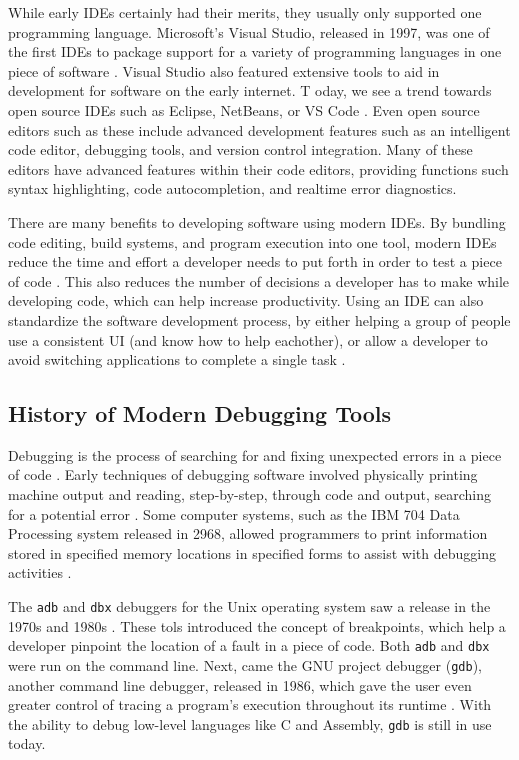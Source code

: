 \documentclass{article}
\begin{document}
While early IDEs certainly had their merits, they usually only supported one programming language. Microsoft's Visual Studio, released in 1997, was one of the first IDEs to package support for a variety of programming languages in one piece of software \cite{Microsoft_1997}. Visual Studio also featured extensive tools to aid in development for software on the early internet. 
T
oday, we see a trend towards open source IDEs such as Eclipse, NetBeans, or VS Code \cite{Apache_2023, EclipseFoundation_2023, Microsoft_2023a}. Even open source editors such as these include advanced development features such as an intelligent code editor, debugging tools, and version control integration. Many of these editors have advanced features within their code editors, providing functions such syntax highlighting, code autocompletion, and realtime error diagnostics. 

There are many benefits to developing software using modern IDEs. By bundling code editing, build systems, and program execution into one tool, modern IDEs reduce the time and effort a developer needs to put forth in order to test a piece of code \cite{Gillis_Silverthorne_2018}. This also reduces the number of decisions a developer has to make while developing code, which can help increase productivity. Using an IDE can also standardize the software development process, by either helping a group of people use a consistent UI (and know how to help eachother), or allow a developer to avoid switching applications to complete a single task \cite{Veracode_2020}. 

\subsection{History of Modern Debugging Tools}

Debugging is the process of searching for and fixing unexpected errors in a piece of code \cite{AWS_2023}. Early techniques of debugging software involved physically printing machine output and reading, step-by-step, through code and output, searching for a potential error \cite{RevDeBug_2020}. Some computer systems, such as the IBM 704 Data Processing system released in 2968, allowed programmers to print information stored in specified memory locations in specified forms to assist with debugging activities \cite{MIT_1957, IBMArchives_2023}. 

The \lstinline{adb} and \lstinline{dbx} debuggers for the Unix operating system saw a release in the 1970s and 1980s \cite{BellLaboratories_1983, Linton_1990}. These tols introduced the concept of breakpoints, which help a developer pinpoint the location of a fault in a piece of code. Both \lstinline{adb} and \lstinline{dbx} were run on the command line. Next, came the GNU project debugger (\lstinline{gdb}), another command line debugger, released in 1986, which gave the user even greater control of tracing a program's execution throughout its runtime \cite{GNU_FSF_2023}. With the ability to debug low-level languages like C and Assembly, \lstinline{gdb} is still in use today.
\end{document}
